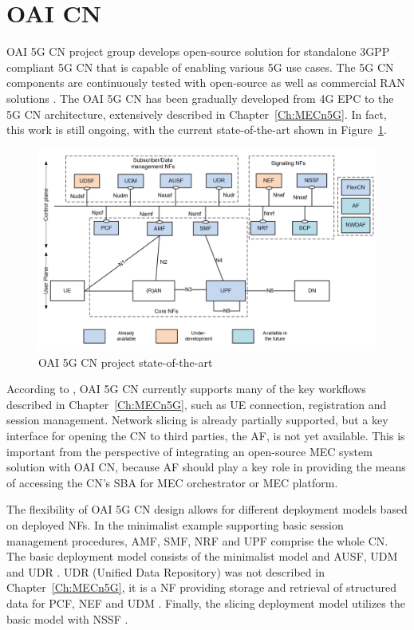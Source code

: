 \documentclass[12pt,a4paper,twoside]{report}
\begin{document}
\section{OAI CN}
OAI 5G CN project group develops open-source solution for standalone 3GPP compliant 5G CN that is capable of enabling various 5G use cases. The 5G CN components are continuously tested with open-source as well as commercial RAN solutions \cite{oai-cn-web}. The OAI 5G CN has been gradually developed from 4G EPC to the 5G CN architecture, extensively described in Chapter~\ref{Ch:MECn5G}. In fact, this work is still ongoing, with the current state-of-the-art shown in Figure~\ref{F:oai-cn-soa}.
%
\begin{figure}[ht]
	\centering
	\includegraphics[width=13cm]{./images/OAI-CN-soa.png} 
	\caption{OAI 5G CN project state-of-the-art \cite{oai-cn-doc}}
	\label{F:oai-cn-soa}
\end{figure}
%
According to \cite{oai-cn-web}, OAI 5G CN currently supports many of the key workflows described in Chapter~\ref{Ch:MECn5G}, such as UE connection, registration and session management. Network slicing is already partially supported, but a key interface for opening the CN to third parties, the AF, is not yet available. This is important from the perspective of integrating an open-source MEC system solution with OAI CN, because AF should play a key role in providing the means of accessing the CN’s SBA for MEC orchestrator or MEC platform. 

The flexibility of OAI 5G CN design allows for different deployment models based on deployed NFs. In the minimalist example supporting basic session management procedures, AMF, SMF, NRF and UPF comprise the whole CN. The basic deployment model consists of the minimalist model and AUSF, UDM and UDR \cite{oai-cn-web}. UDR (Unified Data Repository) was not described in Chapter~\ref{Ch:MECn5G}, it is a NF providing storage and retrieval of structured data for PCF, NEF and UDM \cite{ETSI:TS:udr}. Finally, the slicing deployment model utilizes the basic model with NSSF \cite{oai-cn-web}.
\end{document}
